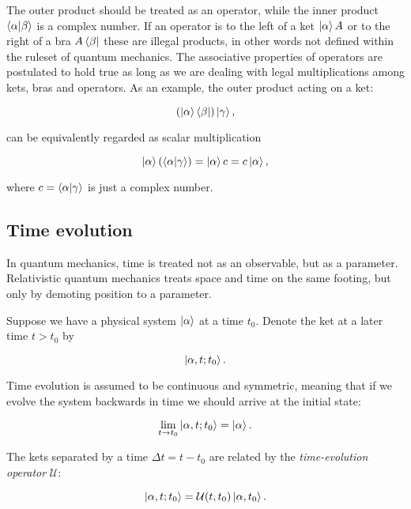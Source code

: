 The outer product should be treated as an operator, while the inner product
$\braket{\alpha | \beta}$ is a complex number.
If an operator is to the left of a ket $\ket{\alpha} A$ or to the right
of a bra $A \bra{\beta}$ these are illegal products, in other words
not defined within the ruleset of quantum mechanics.
The associative properties of operators are postulated to hold true
as long as we are dealing with legal multiplications among kets, bras
and operators. As an example, the outer product acting on a ket:

\begin{equation}
 (\ket{\alpha} \bra{\beta}) \ket{\gamma} ,
\end{equation}

can be equivalently regarded as scalar multiplication

\begin{equation}
 \ket{\alpha} (\braket{\alpha | \gamma})
    = \ket{\alpha} c = c \ket{\alpha} ,
\end{equation}

where $c = \braket{\alpha | \gamma}$ is just a complex number.

\subsection{Time evolution}
In quantum mechanics, time is treated not as an observable,
but as a parameter. Relativistic quantum mechanics
treats space and time on the same footing, but only by demoting
position to a parameter.
\par
Suppose we have a physical system $\ket{\alpha}$
at a time $t_0$. Denote the ket at a later time $t > t_0$ by

\begin{equation}
 \ket{\alpha, t; t_0} .
\end{equation}

Time evolution is assumed to be continuous and symmetric,
meaning that if we evolve the system backwards in time
we should arrive at the initial state:

\begin{equation}
 \lim_{t \rightarrow t_0} \ket{\alpha, t; t_0}
= \ket{\alpha} .
\end{equation}

The kets separated by a time $\Delta t = t - t_0$
are related by the \textit{time-evolution operator} $\mathcal{U}$:

\begin{equation}
 \ket{\alpha, t; t_0} = \mathcal{U}(t, t_0) \ket{\alpha, t_0} .
\end{equation}

